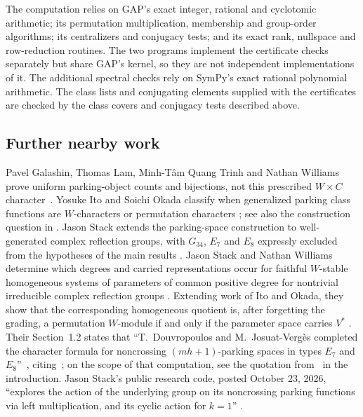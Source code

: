 \documentclass[11pt]{article}
\begin{document}
The computation relies on GAP's exact integer, rational and cyclotomic
arithmetic; its permutation multiplication, membership and group-order
algorithms; its centralizers and conjugacy tests; and its exact rank,
nullspace and row-reduction routines. The two programs implement the
certificate checks separately but share GAP's kernel, so they are not
independent implementations of it. The additional spectral checks rely
on SymPy's exact rational polynomial arithmetic. The class lists and
conjugating elements supplied with the certificates are checked by the
class covers and conjugacy tests described above.

\begin{appendices}
\section{Further nearby work}\label{app:nearby}
Pavel Galashin, Thomas Lam, Minh-T\^am Quang Trinh and Nathan Williams prove
uniform parking-object counts and bijections, not this prescribed
$W\times C$ character~\cite[Theorems~1.8 and~8.17]{GLTW}. Yosuke Ito
and Soichi Okada classify when generalized parking class functions are
$W$-characters or permutation characters \cite[Theorem~1.4]{IO}; see
also the construction question in \cite[Section~7.2]{IO}. Jason Stack
extends the parking-space construction to well-generated complex
reflection groups, with $G_{34}$, $E_7$ and $E_8$ expressly excluded
from the hypotheses of the main results
\cite[Theorems~1.3 and 3.19]{Stack}. Jason Stack and Nathan Williams
determine which degrees and carried representations occur for faithful
$W$-stable homogeneous systems of parameters of common positive degree
for nontrivial irreducible complex reflection groups
\cite[Theorem~1.6]{SW}. Extending work of Ito and Okada, they show that
the corresponding homogeneous quotient is, after forgetting the grading,
a permutation $W$-module if and only if the parameter space carries
$V^*$ \cite[Theorem~1.8]{SW}. Their Section~1.2 states that
``T.~Douvropoulos and M.~Josuat-Verg\`es completed the character
formula for noncrossing $(mh+1)$-parking spaces in types $E_7$ and
$E_8$''~\cite[Section~1.2]{SW}, citing~\cite[Theorems~3.10
and~3.12]{DJV}; on the scope of that computation, see the
quotation from~\cite[Section~3.2]{DJV} in the introduction. Jason
Stack's public research code, posted October 23, 2026, ``explores the
action of the underlying group on its noncrossing parking functions via
left multiplication, and its cyclic action for $k=1$''
\cite[README]{StackCode}.


\end{appendices}
\end{document}
